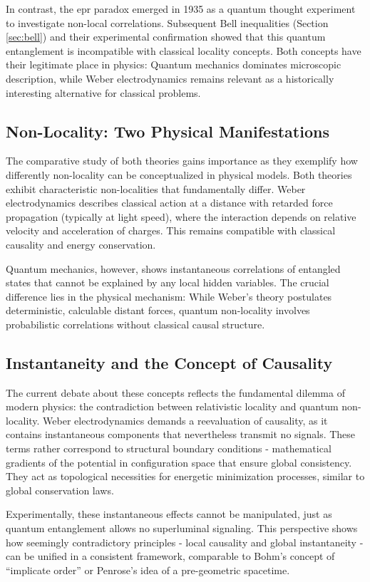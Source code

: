 In contrast, the \gls{epr} paradox emerged in 1935 as a quantum thought experiment to investigate non-local correlations. Subsequent Bell inequalities (Section \ref{sec:bell}) and
their experimental confirmation showed that this quantum entanglement is incompatible with classical locality concepts. Both concepts have their legitimate place in
physics: Quantum mechanics dominates microscopic description, while Weber electrodynamics remains relevant as a historically interesting alternative for classical problems.

\subsection{Non-Locality: Two Physical Manifestations}
The comparative study of both theories gains importance as they exemplify how differently non-locality can be conceptualized in physical models. Both theories exhibit
characteristic non-localities that fundamentally differ. Weber electrodynamics describes classical action at a distance with retarded force propagation (typically at light speed),
where the interaction depends on relative velocity and acceleration of charges. This remains compatible with classical causality and energy conservation.

Quantum mechanics, however, shows instantaneous correlations of entangled states that cannot be explained by any local hidden variables. The crucial difference
lies in the physical mechanism: While Weber's theory postulates deterministic, calculable distant forces, quantum non-locality involves
probabilistic correlations without classical causal structure.

\subsection{Instantaneity and the Concept of Causality}
The current debate about these concepts reflects the fundamental dilemma of modern physics: the contradiction between relativistic locality and quantum
non-locality. Weber electrodynamics demands a reevaluation of causality, as it contains instantaneous components that nevertheless transmit no signals. These terms
rather correspond to structural boundary conditions - mathematical gradients of the potential in configuration space that ensure global consistency. They act as topological
necessities for energetic minimization processes, similar to global conservation laws.

Experimentally, these instantaneous effects cannot be manipulated, just as quantum entanglement allows no superluminal signaling. This perspective shows how seemingly
contradictory principles - local causality and global instantaneity - can be unified in a consistent framework, comparable to Bohm's concept of
\enquote{implicate order} or Penrose's idea of a pre-geometric spacetime.

